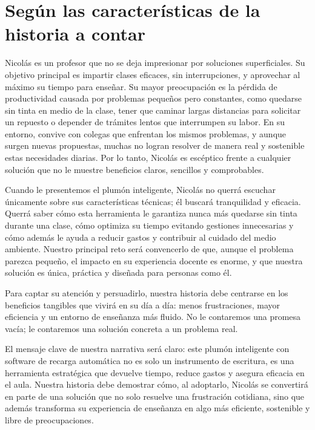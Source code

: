 \section{Según las características de la historia a contar}
Nicolás es un profesor que no se deja impresionar por soluciones superficiales. Su objetivo principal es impartir clases eficaces, sin interrupciones, y aprovechar al máximo su tiempo para enseñar. Su mayor preocupación es la pérdida de productividad causada por problemas pequeños pero constantes, como quedarse sin tinta en medio de la clase, tener que caminar largas distancias para solicitar un repuesto o depender de trámites lentos que interrumpen su labor. En su entorno, convive con colegas que enfrentan los mismos problemas, y aunque surgen nuevas propuestas, muchas no logran resolver de manera real y sostenible estas necesidades diarias. Por lo tanto, Nicolás es escéptico frente a cualquier solución que no le muestre beneficios claros, sencillos y comprobables.

Cuando le presentemos el plumón inteligente, Nicolás no querrá escuchar únicamente sobre sus características técnicas; él buscará tranquilidad y eficacia. Querrá saber cómo esta herramienta le garantiza nunca más quedarse sin tinta durante una clase, cómo optimiza su tiempo evitando gestiones innecesarias y cómo además le ayuda a reducir gastos y contribuir al cuidado del medio ambiente. Nuestro principal reto será convencerlo de que, aunque el problema parezca pequeño, el impacto en su experiencia docente es enorme, y que nuestra solución es única, práctica y diseñada para personas como él.

Para captar su atención y persuadirlo, nuestra historia debe centrarse en los beneficios tangibles que vivirá en su día a día: menos frustraciones, mayor eficiencia y un entorno de enseñanza más fluido. No le contaremos una promesa vacía; le contaremos una solución concreta a un problema real.

El mensaje clave de nuestra narrativa será claro: este plumón inteligente con software de recarga automática no es solo un instrumento de escritura, es una herramienta estratégica que devuelve tiempo, reduce gastos y asegura eficacia en el aula. Nuestra historia debe demostrar cómo, al adoptarlo, Nicolás se convertirá en parte de una solución que no solo resuelve una frustración cotidiana, sino que además transforma su experiencia de enseñanza en algo más eficiente, sostenible y libre de preocupaciones.

\newpage

